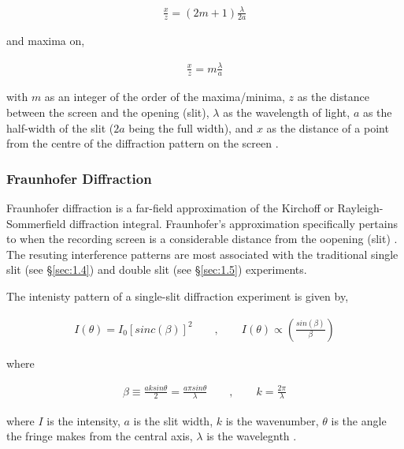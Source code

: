 \documentclass[12pt]{article}
\begin{document}
\vspace{-2ex}
\begin{gather*}
    \frac{x}{z} = (2m + 1) \frac{\lambda}{2a}
\end{gather*}

and maxima on,

\vspace{-2ex}
\begin{gather*}
    \frac{x}{z} = m \frac{\lambda}{a}
\end{gather*}

with $m$ as an integer of the order of the maxima/minima, $z$ as the distance between the screen and the opening (slit), $\lambda$ as the wavelength of light, $a$ as the half-width of the slit ($2a$ being the full width),
and $x$ as the distance of a point from the centre of the diffraction pattern on the screen \cite{fresnelfraunhofer}.

\subsubsection{Fraunhofer Diffraction}

Fraunhofer diffraction is a far-field approximation of the Kirchoff or Rayleigh-Sommerfield diffraction integral. Fraunhofer's approximation specifically pertains to when the recording screen is a considerable distance from the oopening (slit) \cite{fresnelfraunhofer}.
The resuting interference patterns are most associated with the traditional single slit (see §\ref{sec:1.4}) and double slit (see §\ref{sec:1.5}) experiments.

The intenisty pattern of a single-slit diffraction experiment is given by,

\vspace{-2ex}
\begin{gather*}
    I(\theta) = I_0 [sinc(\beta)]^2 \qquad , \qquad I(\theta) \propto \left( \frac{sin(\beta)}{\beta} \right)
\end{gather*}

where

\vspace{-2ex}
\begin{gather*}
    \beta \equiv \frac{ak sin \theta}{2} = \frac{a \pi sin \theta}{\lambda} \qquad , \qquad k = \frac{2 \pi}{\lambda}
\end{gather*}

where $I$ is the intensity, $a$ is the slit width, $k$ is the wavenumber, $\theta$ is the angle the fringe makes from the central axis, $\lambda$ is the wavelegnth \cite{fraunhofer}.
\end{document}

